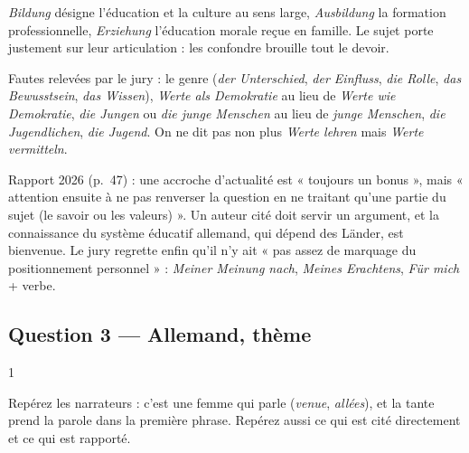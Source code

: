 \documentclass[11pt,a4paper]{article}
\begin{document}
\begin{piege}

\emph{Bildung} désigne l'éducation et la culture au sens large, \emph{Ausbildung} la formation professionnelle, \emph{Erziehung} l'éducation morale reçue en famille. Le sujet porte justement sur leur articulation : les confondre brouille tout le devoir.

\end{piege}

\begin{piege}

Fautes relevées par le jury : le genre (\emph{der Unterschied}, \emph{der Einfluss}, \emph{die Rolle}, \emph{das Bewusstsein}, \emph{das Wissen}), \emph{Werte als Demokratie} au lieu de \emph{Werte wie Demokratie}, \emph{die Jungen} ou \emph{die junge Menschen} au lieu de \emph{junge Menschen}, \emph{die Jugendlichen}, \emph{die Jugend}. On ne dit pas non plus \emph{Werte lehren} mais \emph{Werte vermitteln}.

\end{piege}

\begin{jury}

Rapport 2026 (p.~47) : une accroche d'actualité est « toujours un bonus », mais « attention ensuite à ne pas renverser la question en ne traitant qu'une partie du sujet (le savoir ou les valeurs) ». Un auteur cité doit servir un argument, et la connaissance du système éducatif allemand, qui dépend des Länder, est bienvenue. Le jury regrette enfin qu'il n'y ait « pas assez de marquage du positionnement personnel » : \emph{Meiner Meinung nach}, \emph{Meines Erachtens}, \emph{Für mich} + verbe.

\end{jury}

\hypertarget{question-3-allemand-thuxe8me}{%
\subsection{Question 3 --- Allemand, thème}\label{question-3-allemand-thuxe8me}}

\begin{indication}{1}

Repérez les narrateurs : c'est une femme qui parle (\emph{venue}, \emph{allées}), et la tante prend la parole dans la première phrase. Repérez aussi ce qui est cité directement et ce qui est rapporté.

\end{indication}
\end{document}
